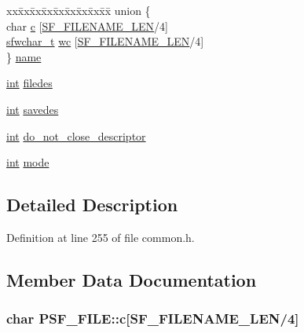 \begin{DoxyCompactItemize}
\begin{tabbing}
\end{tabbing}\item 
\begin{tabbing}
xx\=xx\=xx\=xx\=xx\=xx\=xx\=xx\=xx\=\kill
union \{\\
\>char \hyperlink{struct_p_s_f___f_i_l_e_a5e8ec1f9af1c66d1680de3fdae2e32db}{c} \mbox{[}\hyperlink{libsndfile_2src_2common_8h_a5222b3875de92585fb297741c03e850c}{SF\_FILENAME\_LEN}/4\mbox{]}\\
\>\hyperlink{libsndfile_2src_2common_8h_a804b9fb983bf0783edcaff69ea5de097}{sfwchar\_t} \hyperlink{struct_p_s_f___f_i_l_e_a9ad5bb127092a92ea3556796dc56c4e2}{wc} \mbox{[}\hyperlink{libsndfile_2src_2common_8h_a5222b3875de92585fb297741c03e850c}{SF\_FILENAME\_LEN}/4\mbox{]}\\
\} \hyperlink{struct_p_s_f___f_i_l_e_a211b423500bd35c5d2bc40215a2853b5}{name}\\

\end{tabbing}\item 
\hyperlink{xmltok_8h_a5a0d4a5641ce434f1d23533f2b2e6653}{int} \hyperlink{struct_p_s_f___f_i_l_e_a32448e09e1bd0b3451acfc9710b8a47e}{filedes}
\item 
\hyperlink{xmltok_8h_a5a0d4a5641ce434f1d23533f2b2e6653}{int} \hyperlink{struct_p_s_f___f_i_l_e_a53eecd0ee02c5d803105f075d79e4133}{savedes}
\item 
\hyperlink{xmltok_8h_a5a0d4a5641ce434f1d23533f2b2e6653}{int} \hyperlink{struct_p_s_f___f_i_l_e_afbec12bd6fa6b076331b7bd15b422e74}{do\+\_\+not\+\_\+close\+\_\+descriptor}
\item 
\hyperlink{xmltok_8h_a5a0d4a5641ce434f1d23533f2b2e6653}{int} \hyperlink{struct_p_s_f___f_i_l_e_a79dc5fc1f9c6e1da23a11014d105e7fd}{mode}
\end{DoxyCompactItemize}


\subsection{Detailed Description}


Definition at line 255 of file common.\+h.



\subsection{Member Data Documentation}
\subsubsection[{\texorpdfstring{c}{c}}]{\setlength{\rightskip}{0pt plus 5cm}char P\+S\+F\+\_\+\+F\+I\+L\+E\+::c\mbox{[}{\bf S\+F\+\_\+\+F\+I\+L\+E\+N\+A\+M\+E\+\_\+\+L\+EN}/4\mbox{]}}\hypertarget{struct_p_s_f___f_i_l_e_a5e8ec1f9af1c66d1680de3fdae2e32db}{}\label{struct_p_s_f___f_i_l_e_a5e8ec1f9af1c66d1680de3fdae2e32db}


